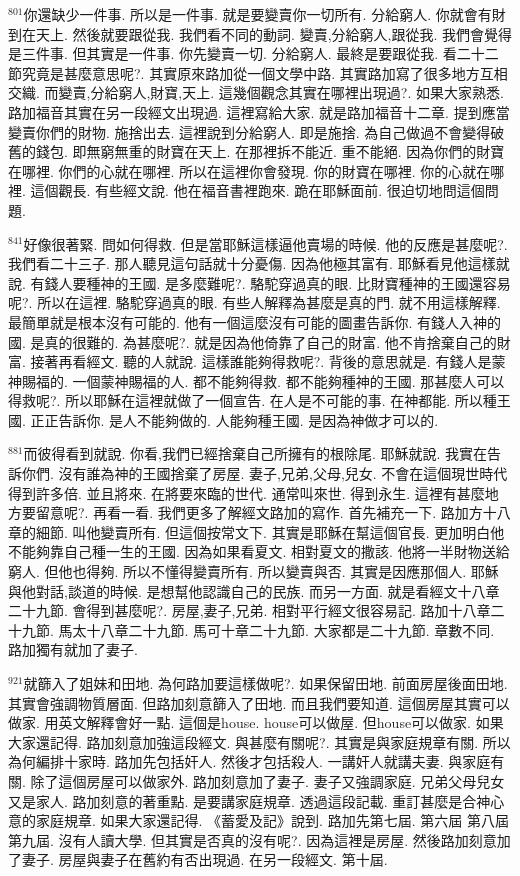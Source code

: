 \documentclass{book}
\begin{document}
$^{801}$你還缺少一件事.
所以是一件事.
就是要變賣你一切所有.
分給窮人.
你就會有財到在天上.
然後就要跟從我.
我們看不同的動詞.
變賣,分給窮人,跟從我.
我們會覺得是三件事.
但其實是一件事.
你先變賣一切.
分給窮人.
最終是要跟從我.
看二十二節究竟是甚麼意思呢?.
其實原來路加從一個文學中路.
其實路加寫了很多地方互相交織.
而變賣,分給窮人,財寶,天上.
這幾個觀念其實在哪裡出現過?.
如果大家熟悉.
路加福音其實在另一段經文出現過.
這裡寫給大家.
就是路加福音十二章.
提到應當變賣你們的財物.
施捨出去.
這裡說到分給窮人.
即是施捨.
為自己做過不會變得破舊的錢包.
即無窮無重的財寶在天上.
在那裡拆不能近.
重不能絕.
因為你們的財寶在哪裡.
你們的心就在哪裡.
所以在這裡你會發現.
你的財寶在哪裡.
你的心就在哪裡.
這個觀長.
有些經文說.
他在福音書裡跑來.
跪在耶穌面前.
很迫切地問這個問題.

$^{841}$好像很著緊.
問如何得救.
但是當耶穌這樣逼他賣場的時候.
他的反應是甚麼呢?.
我們看二十三子.
那人聽見這句話就十分憂傷.
因為他極其富有.
耶穌看見他這樣就說.
有錢人要種神的王國.
是多麼難呢?.
駱駝穿過真的眼.
比財寶種神的王國還容易呢?.
所以在這裡.
駱駝穿過真的眼.
有些人解釋為甚麼是真的門.
就不用這樣解釋.
最簡單就是根本沒有可能的.
他有一個這麼沒有可能的圖畫告訴你.
有錢人入神的國.
是真的很難的.
為甚麼呢?.
就是因為他倚靠了自己的財富.
他不肯捨棄自己的財富.
接著再看經文.
聽的人就說.
這樣誰能夠得救呢?.
背後的意思就是.
有錢人是蒙神賜福的.
一個蒙神賜福的人.
都不能夠得救.
都不能夠種神的王國.
那甚麼人可以得救呢?.
所以耶穌在這裡就做了一個宣告.
在人是不可能的事.
在神都能.
所以種王國.
正正告訴你.
是人不能夠做的.
人能夠種王國.
是因為神做才可以的.

$^{881}$而彼得看到就說.
你看,我們已經捨棄自己所擁有的根除尾.
耶穌就說.
我實在告訴你們.
沒有誰為神的王國捨棄了房屋.
妻子,兄弟,父母,兒女.
不會在這個現世時代得到許多倍.
並且將來.
在將要來臨的世代.
通常叫來世.
得到永生.
這裡有甚麼地方要留意呢?.
再看一看.
我們更多了解經文路加的寫作.
首先補充一下.
路加方十八章的細節.
叫他變賣所有.
但這個按常文下.
其實是耶穌在幫這個官長.
更加明白他不能夠靠自己種一生的王國.
因為如果看夏文.
相對夏文的撒該.
他將一半財物送給窮人.
但他也得夠.
所以不懂得變賣所有.
所以變賣與否.
其實是因應那個人.
耶穌與他對話,談道的時候.
是想幫他認識自己的民族.
而另一方面.
就是看經文十八章二十九節.
會得到甚麼呢?.
房屋,妻子,兄弟.
相對平行經文很容易記.
路加十八章二十九節.
馬太十八章二十九節.
馬可十章二十九節.
大家都是二十九節.
章數不同.
路加獨有就加了妻子.

$^{921}$就篩入了姐妹和田地.
為何路加要這樣做呢?.
如果保留田地.
前面房屋後面田地.
其實會強調物質層面.
但路加刻意篩入了田地.
而且我們要知道.
這個房屋其實可以做家.
用英文解釋會好一點.
這個是house.
house可以做屋.
但house可以做家.
如果大家還記得.
路加刻意加強這段經文.
與甚麼有關呢?.
其實是與家庭規章有關.
所以為何編排十家時.
路加先包括奸人.
然後才包括殺人.
一講奸人就講夫妻.
與家庭有關.
除了這個房屋可以做家外.
路加刻意加了妻子.
妻子又強調家庭.
兄弟父母兒女又是家人.
路加刻意的著重點.
是要講家庭規章.
透過這段記載.
重訂甚麼是合神心意的家庭規章.
如果大家還記得.
《蓄愛及記》說到.
路加先第七屆.
第六屆 第八屆 第九屆.
沒有人讀大學.
但其實是否真的沒有呢?.
因為這裡是房屋.
然後路加刻意加了妻子.
房屋與妻子在舊約有否出現過.
在另一段經文.
第十屆.
\end{document}
